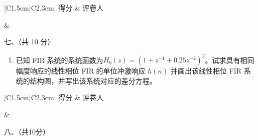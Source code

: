 \documentclass[UTF8,a4paper,12pt]{ctexart}
\begin{document}
\noindent
\begin{minipage}[t]{0.25\textwidth}
\renewcommand{\arraystretch}{1.5}
\begin{tabular}{|C{1.5cm}|C{2.3cm}|}
\hline
得分 & 评卷人 \\
\hline
\rule{0pt}{0.8cm}&  \\
\hline
\end{tabular}
\end{minipage}
\begin{minipage}[t]{0.72\textwidth}
\vspace{0.2cm}
\begin{center}
{\heiti 七、（共 10 分）}
\end{center}
\end{minipage}

\vspace{1.2em}

\begin{enumerate}[label={}, leftmargin=2em, itemsep=1.6em]

\item 已知 FIR 系统的系统函数为$H_0(z)=\left(1+z^{-1}+0.25z^{-2}\right)^2$。试求具有相同幅度响应的线性相位 FIR 的单位冲激响应 $h(n)$ 并画出该线性相位 FIR 系统的结构图，并写出该系统对应的差分方程。
\vspace{0.6em}

\newpage

\vspace*{2cm}

\end{enumerate}

\noindent
\begin{minipage}[t]{0.25\textwidth}
\renewcommand{\arraystretch}{1.5}
\begin{tabular}{|C{1.5cm}|C{2.3cm}|}
\hline
得分 & 评卷人 \\
\hline
\rule{0pt}{0.8cm}&  \\
\hline
\end{tabular}
\end{minipage}
\begin{minipage}[t]{0.72\textwidth}
\vspace{0.2cm}
\begin{center}
{\heiti 八、（共10分）}
\end{center}
\end{minipage}

\vspace{1.2em}
\end{document}
